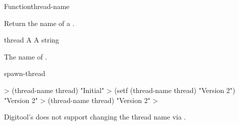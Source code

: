 \begin{functiondoc}{Function}{thread-name}{ 
   \returns{} } 

\fnsyntax

\fnpurpose Return the name of a .

\fnsetf
{}

\fnpackage {}

\fnmodule {}

\fnargs
\begin{args}{thread}
\arg[thread] A 
 A string
\end{args}

\fnreturns The name of .

\fnerrors
\nothreads{}

\begin{alsos}{spawn-thread}
\end{alsos}

\fnexamples
%
\W\supp
\begin{example}
  > (thread-name thread)
  "Initial"
  > (setf (thread-name thread) "Version 2")
  "Version 2"
  > (thread-name thread)
  "Version 2"
  >
\end{example}

\fnnote Digitool's 
does not support changing the thread name via .

\end{functiondoc}



